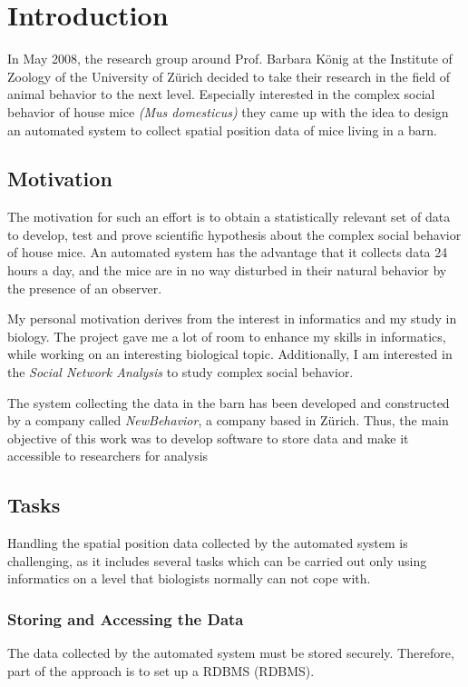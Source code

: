 \newpage

\section{Introduction}
\label{sec:introduction}

In May 2008, the research group around Prof. Barbara K\"onig at the Institute of Zoology of the University of Z\"urich decided to take their research in the field of animal behavior to the next level. Especially interested in the complex social behavior of house mice \textit{(Mus domesticus)} they came up with the idea to design an automated system to collect spatial position data of mice living in a barn.

\subsection{Motivation}
\label{subsec:motivation}
The motivation for such an effort is to obtain a statistically relevant set of data to develop, test and prove scientific hypothesis about the complex social behavior of house mice. An automated system has the advantage that it collects data 24 hours a day, and the mice are in no way disturbed in their natural behavior by the presence of an observer.

My personal motivation derives from the interest in informatics and my study in biology. The project gave me a lot of room to enhance my skills in informatics, while working on an interesting biological topic. Additionally, I am interested in the \textit{Social Network Analysis} to study complex social behavior.

The system collecting the data in the barn has been developed and constructed by a company called \textit{NewBehavior}, a company based in Z\"urich. Thus, the main objective of this work was to develop software to store data and make it accessible to researchers for analysis 

\subsection{Tasks}
\label{subsec:task}
Handling the spatial position data collected by the automated system is challenging, as it includes several tasks which can be carried out only using informatics on a level that biologists normally can not cope with.

\subsubsection{Storing and Accessing the Data}
\label{subsubsec:storeaccess}
The data collected by the automated system must be stored securely. Therefore, part of the approach is to set up a \ac{RDBMS} (RDBMS). 

